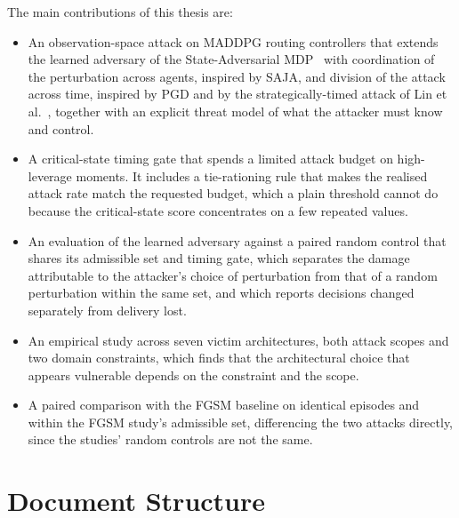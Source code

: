 The main contributions of this thesis are:
\begin{itemize}
  \item An observation-space attack on MADDPG routing controllers that extends the
        learned adversary of the State-Adversarial MDP~\cite{zhang2020robust} with
        coordination of the perturbation across agents, inspired by SAJA, and division
        of the attack across time, inspired by PGD and by the strategically-timed
        attack of Lin et al.~\cite{lin2019tacticsadversarialattackdeep}, together with
        an explicit threat
        model of what the attacker must know and control.
  \item A critical-state timing gate that spends a limited attack budget on
        high-leverage moments. It includes a tie-rationing rule that makes the
        realised attack rate match the requested budget, which a plain threshold
        cannot do because the critical-state score concentrates on a few repeated
        values.
  \item An evaluation of the learned adversary against a paired random control that
        shares its admissible set and timing gate, which separates the damage
        attributable to the attacker's choice of perturbation from that of a random
        perturbation within the same set, and which reports decisions changed
        separately from delivery lost.
  \item An empirical study across seven victim architectures, both attack scopes and
        two domain constraints, which finds that the architectural choice that appears
        vulnerable depends on the constraint and the scope.
  \item A paired comparison with the FGSM baseline on identical episodes and within
        the FGSM study's admissible set, differencing the two attacks directly, since
        the studies' random controls are not the same.
\end{itemize}

\section{Document Structure}
\label{sec:intro_structure}

